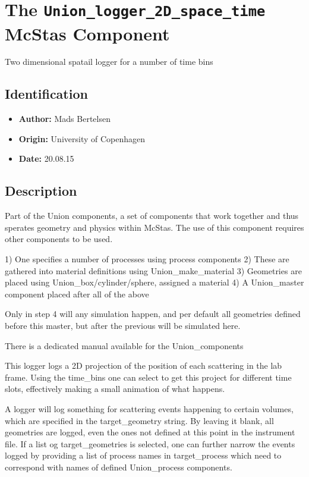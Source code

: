 \section{The \texttt{Union\_logger\_2D\_space\_time} McStas Component}
Two dimensional spatail logger for a number of time bins

\subsection*{Identification}
\begin{itemize}
  \item \textbf{Author:} Mads Bertelsen
  \item \textbf{Origin:} University of Copenhagen
  \item \textbf{Date:} 20.08.15
\end{itemize}

\subsection*{Description}
Part of the Union components, a set of components that work together and thus sperates geometry and physics within McStas. The use of this component requires other components to be used.

1) One specifies a number of processes using process components 2) These are gathered into material definitions using Union\_make\_material 3) Geometries are placed using Union\_box/cylinder/sphere, assigned a material 4) A Union\_master component placed after all of the above

Only in step 4 will any simulation happen, and per default all geometries defined before this master, but after the previous will be simulated here.

There is a dedicated manual available for the Union\_components

This logger logs a 2D projection of the position of each scattering in the lab frame. Using the time\_bins one can select to get this project for different time slots, effectively making a small animation of what happens.

A logger will log something for scattering events happening to certain volumes, which are specified in the target\_geometry string. By leaving it blank, all geometries are logged, even the ones not defined at this point in the instrument file. If a list og target\_geometries is selected, one can further narrow the events logged by providing a list of process names in target\_process which need to correspond with names of defined Union\_process components.


